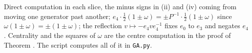 Direct computation in each slice, the minus signs in (ii) and (iv) coming from moving one generator past another; $e_{4}\cdot\tfrac{1}{2}(1 \pm \omega) = \pm P^{-1}\cdot\tfrac{1}{2}(1 \pm \omega)$ since $\omega(1 \pm \omega) = \pm(1 \pm \omega)$; the reflection $v \mapsto -e_{4}ve_{4}^{-1}$ fixes $e_{0}$ to $e_{3}$ and negates $e_{4}$. Centrality and the squares of $\omega$ are the centre computation in the proof of Theorem . The script computes all of it in \texttt{GA.py}.
